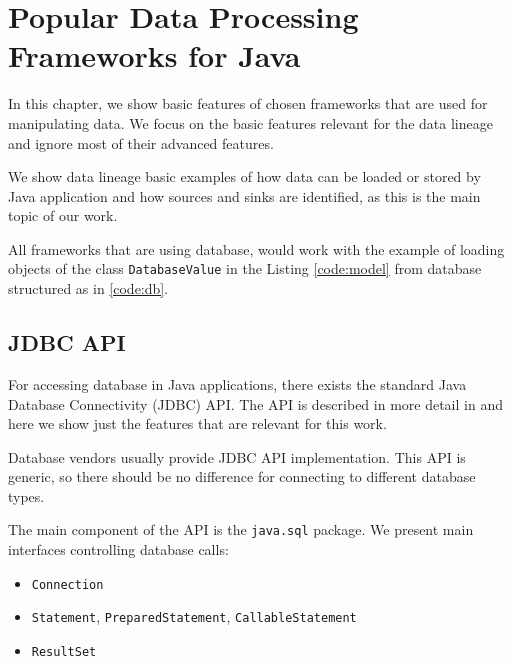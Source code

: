 \newcommand{\InsertCode}[2]{\begin{figure}[#1]\end{figure}}

\newcommand{\Code}[1]{\texttt{#1}}

\chapter{Popular Data Processing Frameworks for Java \label{chapter:frameworks}}

In this chapter, we show basic features of chosen frameworks
that are used for manipulating data.
We focus on the basic features relevant for the data lineage
and ignore most of their advanced features.

We show data lineage basic examples of how data can be loaded or stored by Java application
and how sources and sinks are identified, as this is the main topic of our work.

All frameworks that are using database, would work with the example
of loading objects of the class \Code{DatabaseValue} in the Listing \ref{code:model}
from database structured as in \ref{code:db}.

\InsertCode{h}{code/model}






\section{JDBC API \label{frameworks:jdbc}}

For accessing database in Java applications, there exists the standard
Java Database Connectivity (JDBC) API.
The API is described in more detail in \citet{JDBC_OVERVIEW}
and here we show just the features that are relevant for this work.

Database vendors usually provide JDBC API implementation. This API is generic, so
there should be no difference for connecting to different database types.

The main component of the API is the \Code{java.sql} \citep{java.sql} package.
We present main interfaces controlling database calls:
\begin{itemize}
  \item \Code{Connection}
  \item \Code{Statement}, \Code{PreparedStatement}, \Code{CallableStatement}
  \item \Code{ResultSet}
\end{itemize}

